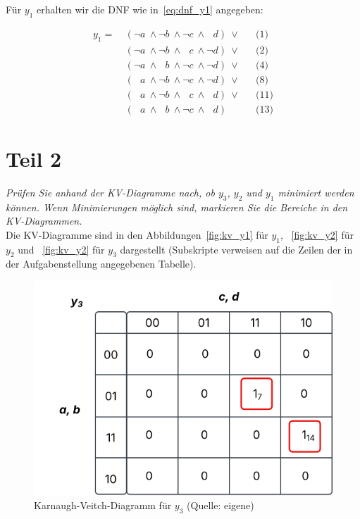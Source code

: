\noindent
Für $y_1$ erhalten wir die DNF wie in~\ref{eq:dnf_y1} angegeben:


\begin{equation}\label{eq:dnf_y1}
\begin{alignat}{3}
    y_1 =\ &(\neg a \ \land \neg b \ \land \neg c \ \land \phantom{\neg} d)\ \lor && \text{(1)}  \\
    &(\neg a \ \land \neg b \ \land  \phantom{\neg} c \ \land \neg d)\ \lor && \text{(2)}  \\
    &(\neg a \ \land  \phantom{\neg} b \ \land \neg  c \ \land \neg d)\ \lor && \text{(4)}  \\
    &(\phantom{\neg} a \ \land  \neg b \ \land \neg  c \ \land \neg d)\ \lor && \text{(8)}  \\
    &(\phantom{\neg} a \ \land  \neg b \ \land \phantom{\neg} c \ \land  \phantom{\neg} d)\ \lor && \text{(11)}  \\
    &(\phantom{\neg} a \ \land   \phantom{\neg} b \ \land \neg c \ \land  \phantom{\neg} d) && \text{(13)}
\end{alignat}
\end{equation}


\section{Teil 2}

\textit{Prüfen Sie anhand der KV-Diagramme nach, ob $y_3$, $y_2$ und $y_1$ minimiert
werden können. Wenn Minimierungen möglich sind, markieren Sie die Bereiche in den KV-Diagrammen.}\\

\noindent
Die KV-Diagramme sind in den Abbildungen~\ref{fig:kv_y1} für $y_1$, ~\ref{fig:kv_y2} für $y_2$ und ~\ref{fig:kv_y2} für $y_3$ dargestellt (Subskripte verweisen auf die Zeilen der in der Aufgabenstellung angegebenen Tabelle).
\\

\begin{figure}
    \centering
    \includegraphics[scale=0.5]{aufgabe 2/img/kv_y3}
    \caption{Karnaugh-Veitch-Diagramm für $y_3$ (Quelle: eigene)}
    \label{fig:kv_y3}
\end{figure}

